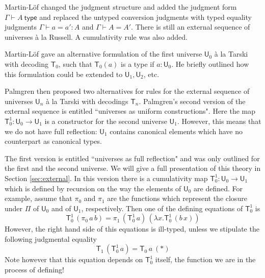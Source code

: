 \documentclass[11pt,a4paper]{article}
\def\UU{\mathsf{U}}
\newcommand{\type}{\mathsf{type}}
\newcommand{\T}{\mathsf{T}}
\begin{document}
Martin-Löf \cite{martinlof:hannover} changed the judgment structure and added the judgment form $\Gamma \vdash A\ \type$
and replaced the untyped conversion judgments with typed equality judgments $\Gamma \vdash a = a' : A$ and $\Gamma \vdash A = A'$. There is still an external sequence of universes \`a la Russell. A cumulativity rule was also added.

Martin-Löf \cite{martinlof:padova} gave an alternative formulation of the first universe $\UU_0$ \`a la Tarski with decoding $\T_0$, such that $\T_0(a)$ is a type if $a : \UU_0$. He briefly outlined how this formulation could be extended to $\UU_1, \UU_2$, etc.

Palmgren \cite{palmgren:venice} then proposed two alternatives for rules for the external sequence of universes $\UU_n$ \`a la Tarski with decodings $\T_n$. 
Palmgren's second version of the external sequence is entitled ``universes as uniform constructions". Here the map $\T_0^1 : \UU_0 \to \UU_1$ is a constructor for the second universe $\UU_1$. However, this means that we do not have full reflection: $\UU_1$ contains canonical elements which have no counterpart as canonical types.

The first version is entitled ``universes as full reflection" and was only outlined for the first and the second universe. We will give a full presentation of this theory in Section \ref{sec:external}. In this version there is a cumulativity map $\T_0^1 : \UU_0 \to \UU_1$ which is defined by recursion on the way the elements of $\UU_0$ are defined. For example, assume that $\pi_0$ and $\pi_1$ are the functions which represent the closure under $\Pi$ of $\UU_0$ and of $\UU_1$, respectively. Then one of the defining equations of $\T_0^1$ is
$$
\T_0^1\, (\pi_0\,a\, b) = \pi_1\,(\T_0^1\,a)\,(\lambda x.\T_0^1\,(b\,x))
$$
However, the right hand side of this equations is ill-typed, unless we stipulate the following judgmental equality
$$
\T_1\, (\T_0^1\, a) = \T_0\, a\ (*)
$$
Note however that this equation depends on $\T_0^1$ itself, the function we are in the process of defining! 
\end{document}
